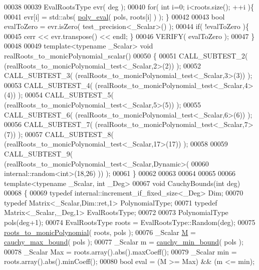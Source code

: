 \begin{DoxyCode}
00038 
00039   EvalRootsType evr( deg );
00040   \textcolor{keywordflow}{for}( \textcolor{keywordtype}{int} i=0; i<roots.size(); ++i )\{
00041     evr[i] = std::abs( \hyperlink{namespace_eigen_adb64ffddaa9e83634e3ab0e3fd3664f5}{poly\_eval}( pols, roots[i] ) ); \}
00042 
00043   \textcolor{keywordtype}{bool} evalToZero = evr.isZero( test\_precision<\_Scalar>() );
00044   \textcolor{keywordflow}{if}( !evalToZero )\{
00045     cerr << evr.transpose() << endl; \}
00046   VERIFY( evalToZero );
00047 \}
00048 
00049 \textcolor{keyword}{template}<\textcolor{keyword}{typename} \_Scalar> \textcolor{keywordtype}{void} realRoots\_to\_monicPolynomial\_scalar()
00050 \{
00051   CALL\_SUBTEST\_2( (realRoots\_to\_monicPolynomial\_test<\_Scalar,2>(2)) );
00052   CALL\_SUBTEST\_3( (realRoots\_to\_monicPolynomial\_test<\_Scalar,3>(3)) );
00053   CALL\_SUBTEST\_4( (realRoots\_to\_monicPolynomial\_test<\_Scalar,4>(4)) );
00054   CALL\_SUBTEST\_5( (realRoots\_to\_monicPolynomial\_test<\_Scalar,5>(5)) );
00055   CALL\_SUBTEST\_6( (realRoots\_to\_monicPolynomial\_test<\_Scalar,6>(6)) );
00056   CALL\_SUBTEST\_7( (realRoots\_to\_monicPolynomial\_test<\_Scalar,7>(7)) );
00057   CALL\_SUBTEST\_8( (realRoots\_to\_monicPolynomial\_test<\_Scalar,17>(17)) );
00058 
00059   CALL\_SUBTEST\_9( (realRoots\_to\_monicPolynomial\_test<\_Scalar,Dynamic>(
00060           internal::random<int>(18,26) )) );
00061 \}
00062 
00063 
00064 
00065 
00066 \textcolor{keyword}{template}<\textcolor{keyword}{typename} \_Scalar, \textcolor{keywordtype}{int} \_Deg>
00067 \textcolor{keywordtype}{void} CauchyBounds(\textcolor{keywordtype}{int} deg)
00068 \{
00069   \textcolor{keyword}{typedef} internal::increment\_if\_fixed\_size<\_Deg>            Dim;
00070   \textcolor{keyword}{typedef} Matrix<\_Scalar,Dim::ret,1>                  PolynomialType;
00071   \textcolor{keyword}{typedef} Matrix<\_Scalar,\_Deg,1>                      EvalRootsType;
00072 
00073   PolynomialType pols(deg+1);
00074   EvalRootsType roots = EvalRootsType::Random(deg);
00075   \hyperlink{namespace_eigen_afbc3648f7ef67db3d5d04454fc1257fd}{roots\_to\_monicPolynomial}( roots, pols );
00076   \_Scalar \hyperlink{group___core___module_class_eigen_1_1_matrix}{M} = \hyperlink{namespace_eigen_ac90ec4513aa09bb8ad54daa209322d03}{cauchy\_max\_bound}( pols );
00077   \_Scalar m = \hyperlink{namespace_eigen_a43f0af310d5cc131eb5e806f241af951}{cauchy\_min\_bound}( pols );
00078   \_Scalar Max = roots.array().abs().maxCoeff();
00079   \_Scalar min = roots.array().abs().minCoeff();
00080   \textcolor{keywordtype}{bool} eval = (M >= Max) && (m <= min);

\end{DoxyCode}
